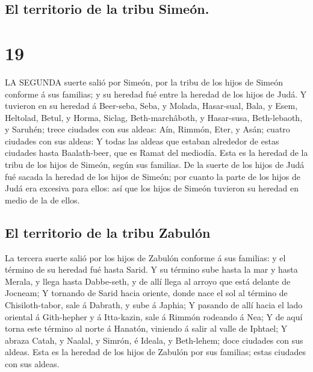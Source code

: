 \hypertarget{el-territorio-de-la-tribu-simeuxf3n.}{%
\subsection{El territorio de la tribu
Simeón.}\label{el-territorio-de-la-tribu-simeuxf3n.}}

\hypertarget{section-18}{%
\section{19}\label{section-18}}

 LA SEGUNDA suerte salió por Simeón, por la tribu de los
hijos de Simeón conforme á sus familias; y su heredad fué entre la
heredad de los hijos de Judá.  Y tuvieron en su heredad á
Beer-seba, Seba, y Molada,  Hasar-sual, Bala, y Esem,
 Heltolad, Betul, y Horma,  Siclag,
Beth-marchâboth, y Hasar-susa,  Beth-lebaoth, y Saruhén;
trece ciudades con sus aldeas:  Aín, Rimmón, Eter, y Asán;
cuatro ciudades con sus aldeas:  Y todas las aldeas que
estaban alrededor de estas ciudades hasta Baalath-beer, que es Ramat del
mediodía. Esta es la heredad de la tribu de los hijos de Simeón, según
sus familias.  De la suerte de los hijos de Judá fué sacada
la heredad de los hijos de Simeón; por cuanto la parte de los hijos de
Judá era excesiva para ellos: así que los hijos de Simeón tuvieron su
heredad en medio de la de ellos.

\hypertarget{el-territorio-de-la-tribu-zabuluxf3n}{%
\subsection{El territorio de la tribu
Zabulón}\label{el-territorio-de-la-tribu-zabuluxf3n}}

 La tercera suerte salió por los hijos de Zabulón conforme
á sus familias: y el término de su heredad fué hasta Sarid.
 Y su término sube hasta la mar y hasta Merala, y llega
hasta Dabbe-seth, y de allí llega al arroyo que está delante de Jocneam;
 Y tornando de Sarid hacia oriente, donde nace el sol al
término de Chisiloth-tabor, sale á Dabrath, y sube á Japhia;
 Y pasando de allí hacia el lado oriental á Gith-hepher y á
Itta-kazin, sale á Rimmón rodeando á Nea;  Y de aquí torna
este término al norte á Hanatón, viniendo á salir al valle de Iphtael;
 Y abraza Catah, y Naalal, y Simrón, é Ideala, y
Beth-lehem; doce ciudades con sus aldeas.  Esta es la
heredad de los hijos de Zabulón por sus familias; estas ciudades con sus
aldeas.

